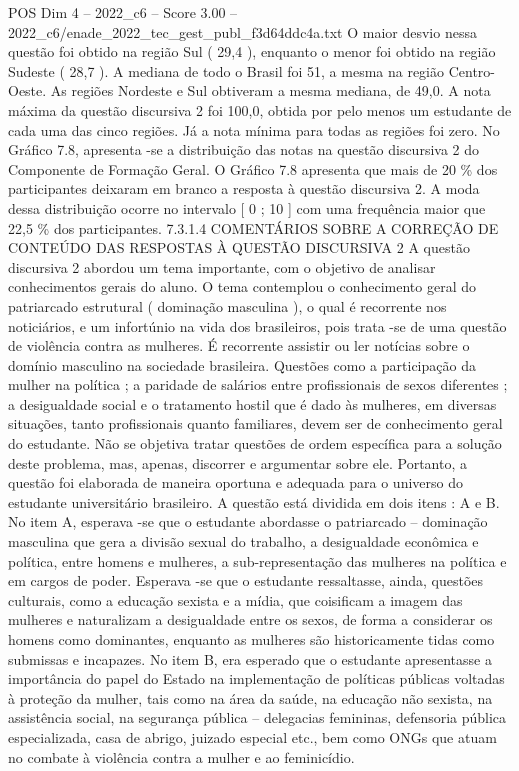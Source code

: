 \begin{textsample}{POS Dim 4 – 2022\_c6 – Score 3.00 – 2022\_c6/enade\_2022\_tec\_gest\_publ\_f3d64ddc4a.txt}
O maior desvio nessa questão foi obtido na região Sul ( 29,4 ), enquanto o menor foi obtido na região Sudeste ( 28,7 ).
A mediana de todo o Brasil foi 51, a mesma na região Centro-Oeste.
As regiões Nordeste e Sul obtiveram a mesma mediana, de 49,0.
A nota máxima da questão discursiva 2 foi 100,0, obtida por pelo menos um estudante de cada uma das cinco regiões.
Já a nota mínima para todas as regiões foi zero.
No Gráfico 7.8, apresenta -se a distribuição das notas na questão discursiva 2 do Componente de Formação Geral.
O Gráfico 7.8 apresenta que mais de 20 \% dos participantes deixaram em branco a resposta à questão discursiva 2.
A moda dessa distribuição ocorre no intervalo [ 0 ; 10 ] com uma frequência maior que 22,5 \% dos participantes. 7.3.1.4 COMENTÁRIOS SOBRE A CORREÇÃO DE CONTEÚDO DAS RESPOSTAS À QUESTÃO DISCURSIVA 2 A questão discursiva 2 abordou um tema importante, com o objetivo de analisar conhecimentos gerais do aluno.
O tema contemplou o conhecimento geral do patriarcado estrutural ( dominação masculina ), o qual é recorrente nos noticiários, e um infortúnio na vida dos brasileiros, pois trata -se de uma questão de violência contra as mulheres.
É recorrente assistir ou ler notícias sobre o domínio masculino na sociedade brasileira.
Questões como a participação da mulher na política ; a paridade de salários entre profissionais de sexos diferentes ; a desigualdade social e o tratamento hostil que é dado às mulheres, em diversas situações, tanto profissionais quanto familiares, devem ser de conhecimento geral do estudante.
Não se objetiva tratar questões de ordem específica para a solução deste problema, mas, apenas, discorrer e argumentar sobre ele.
Portanto, a questão foi elaborada de maneira oportuna e adequada para o universo do estudante universitário brasileiro.
A questão está dividida em dois itens : A e B.
No item A, esperava -se que o estudante abordasse o patriarcado – dominação masculina que gera a divisão sexual do trabalho, a desigualdade econômica e política, entre homens e mulheres, a sub-representação das mulheres na política e em cargos de poder.
Esperava -se que o estudante ressaltasse, ainda, questões culturais, como a educação sexista e a mídia, que coisificam a imagem das mulheres e naturalizam a desigualdade entre os sexos, de forma a considerar os homens como dominantes, enquanto as mulheres são historicamente tidas como submissas e incapazes.
No item B, era esperado que o estudante apresentasse a importância do papel do Estado na implementação de políticas públicas voltadas à proteção da mulher, tais como na área da saúde, na educação não sexista, na assistência social, na segurança pública – delegacias femininas, defensoria pública especializada, casa de abrigo, juizado especial etc., bem como ONGs que atuam no combate à violência contra a mulher e ao feminicídio.

\end{textsample}
